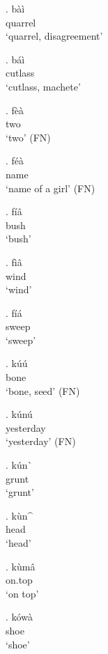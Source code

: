 \documentclass{assets/fieldnotes}
\begin{document}


\exg. b\`{a}\`{i} \\
quarrel \\
`quarrel, disagreement' 

\exg. b\'{a}\`{i} \\
cutlass \\
`cutlass, machete' 

\exg. f\`{e}\`{a} \\
two \\
`two' (FN)

\exg. f\'{e}\`{a} \\
name \\
`name of a girl' (FN)

\exg. f\'{i}\^{a} \\
bush \\
`bush'

\exg. f\`{i}\^{a} \\
wind \\
`wind'

\exg. f\'{i}\'{a}\\
sweep \\
`sweep'

\exg. k\'{u}\'{u} \\
bone \\
`bone, seed' (FN)

\exg. k\'{u}n\'{u} \\
yesterday \\
`yesterday' (FN)

\exg. k\'{u}n\`{} \\
grunt \\
`grunt'

\exg. k\`{u}n\^{} \\
head \\
`head'

\exg. k\`{u}m\^{a} \\
on.top \\
`on top'

\exg. k\'{o}w\`{a} \\
shoe \\
`shoe'

\newpage 
\end{document}
